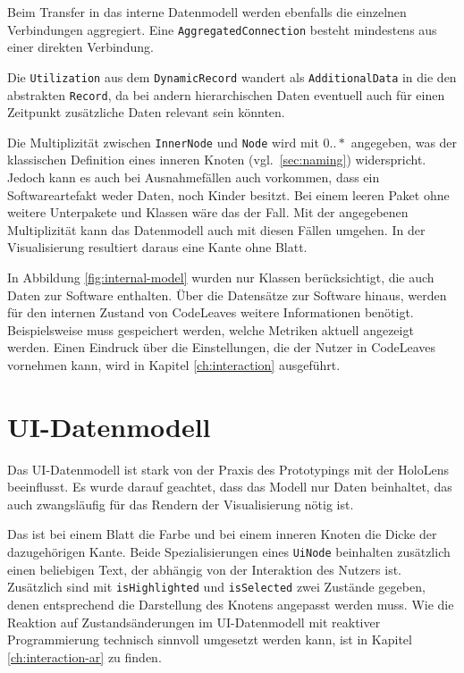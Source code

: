 Beim Transfer in das interne Datenmodell werden ebenfalls die einzelnen Verbindungen aggregiert. Eine \texttt{AggregatedConnection} besteht mindestens aus einer direkten Verbindung.

Die \texttt{Utilization} aus dem \texttt{DynamicRecord} wandert als \texttt{AdditionalData} in die den abstrakten \texttt{Record}, da bei andern hierarchischen Daten eventuell auch für einen Zeitpunkt zusätzliche Daten relevant sein könnten.

Die Multiplizität zwischen \texttt{InnerNode} und \texttt{Node} wird mit $0..*$ angegeben, was der klassischen Definition eines inneren Knoten (vgl.\ \ref{sec:naming}) widerspricht. Jedoch kann es auch bei Ausnahmefällen auch vorkommen, dass ein Softwareartefakt weder Daten, noch Kinder besitzt. Bei einem leeren Paket ohne weitere Unterpakete und Klassen wäre das der Fall. Mit der angegebenen Multiplizität kann das Datenmodell auch mit diesen Fällen umgehen. In der Visualisierung resultiert daraus eine Kante ohne Blatt.

In Abbildung \ref{fig:internal-model} wurden nur Klassen berücksichtigt, die auch Daten zur Software enthalten. Über die Datensätze zur Software hinaus, werden für den internen Zustand von CodeLeaves weitere Informationen benötigt. Beispielsweise muss gespeichert werden, welche Metriken aktuell angezeigt werden. Einen Eindruck über die Einstellungen, die der Nutzer in CodeLeaves vornehmen kann, wird in Kapitel \ref{ch:interaction} ausgeführt.

\section{UI-Datenmodell}
\label{sec:hierarchical-model}

Das UI-Datenmodell ist stark von der Praxis des Prototypings mit der HoloLens beeinflusst. Es wurde darauf geachtet, dass das Modell nur Daten beinhaltet, das auch zwangsläufig für das Rendern der Visualisierung nötig ist.

Das ist bei einem Blatt die Farbe und bei einem inneren Knoten die Dicke der dazugehörigen Kante. Beide Spezialisierungen eines \texttt{UiNode} beinhalten zusätzlich einen beliebigen Text, der abhängig von der Interaktion des Nutzers ist. Zusätzlich sind mit \texttt{isHighlighted} und \texttt{isSelected} zwei Zustände gegeben, denen entsprechend die Darstellung des Knotens angepasst werden muss. Wie die Reaktion auf Zustandsänderungen im UI-Datenmodell mit reaktiver Programmierung technisch sinnvoll umgesetzt werden kann, ist in Kapitel \ref{ch:interaction-ar} zu finden.

